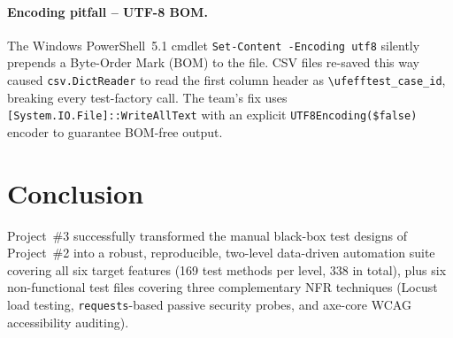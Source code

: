 \documentclass[twoside,final]{hcmut-report}
\begin{document}
\paragraph{Encoding pitfall -- UTF-8 BOM.}
The Windows PowerShell~5.1 cmdlet \texttt{Set-Content -Encoding utf8} silently prepends a Byte-Order Mark (BOM) to the file. CSV files re-saved this way caused \texttt{csv.DictReader} to read the first column header as \texttt{\textbackslash{}ufefftest\_case\_id}, breaking every test-factory call. The team's fix uses \texttt{[System.IO.File]::WriteAllText} with an explicit \texttt{UTF8Encoding(\$false)} encoder to guarantee BOM-free output.

\section{Conclusion}
Project~\#3 successfully transformed the manual black-box test designs of Project~\#2 into a robust, reproducible, two-level data-driven automation suite covering all six target features (169 test methods per level, 338 in total), plus six non-functional test files covering three complementary NFR techniques (Locust load testing, \texttt{requests}-based passive security probes, and axe-core WCAG accessibility auditing).
\end{document}
